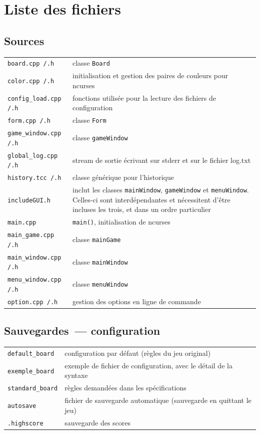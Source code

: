 \documentclass[11pt,a4paper]{article}
\begin{document}
\clearpage
\appendix

\section{Liste des fichiers}
\subsection*{Sources}
\begin{tabular}{lp{80mm}}
\verb"board.cpp /.h" & classe \verb"Board" \\
\verb"color.cpp /.h" & initialisation et gestion des paires de couleurs pour ncurses \\
\verb"config_load.cpp /.h" & fonctions utilisée pour la lecture des fichiers de configuration \\
\verb"form.cpp /.h" & classe \verb"Form" \\
\verb"game_window.cpp /.h" & classe \verb"gameWindow" \\
\verb"global_log.cpp /.h" & stream de sortie écrivant sur stderr et sur le fichier log.txt \\
\verb"history.tcc /.h" & classe générique pour l'historique \\
\verb"includeGUI.h" & inclut les classes \verb"mainWindow", \verb"gameWindow" et \verb"menuWindow". Celles-ci sont interdépendantes et nécessitent d'être incluses les trois, et dans un ordre particulier \\
\verb"main.cpp" & \verb"main()", initialisation de ncurses \\
\verb"main_game.cpp /.h" & classe \verb"mainGame" \\
\verb"main_window.cpp /.h" & classe \verb"mainWindow" \\
\verb"menu_window.cpp /.h" & classe \verb"menuWindow" \\
\verb"option.cpp /.h" & gestion des options en ligne de commande \\
\end{tabular}

\subsection*{Sauvegardes~--- configuration}
\begin{tabular}{lp{80mm}}
\verb"default_board" & configuration par défaut (règles du jeu original) \\
\verb"exemple_board" & exemple de fichier de configuration, avec le détail de la syntaxe \\
\verb"standard_board" & règles demandées dans les spécifications \\
\verb"autosave" & fichier de sauvegarde automatique (sauvegarde en quittant le jeu) \\
\verb".highscore" & sauvegarde des scores \\
\end{tabular}
\end{document}
